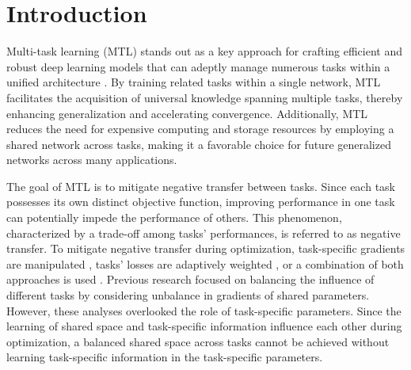 \section{Introduction}
Multi-task learning (MTL) stands out as a key approach for crafting efficient and robust deep learning models that can adeptly manage numerous tasks within a unified architecture \citep{caruana1997multitask}. By training related tasks within a single network, MTL facilitates the acquisition of universal knowledge spanning multiple tasks, thereby enhancing generalization and accelerating convergence. Additionally, MTL reduces the need for expensive computing and storage resources by employing a shared network across tasks, making it a favorable choice for future generalized networks across many applications.

The goal of MTL is to mitigate negative transfer \citep{crawshaw2020multi} between tasks. Since each task possesses its own distinct objective function, improving performance in one task can potentially impede the performance of others. This phenomenon, characterized by a trade-off among tasks' performances, is referred to as negative transfer. To mitigate negative transfer during optimization, task-specific gradients are manipulated \citep{RN19, RN36, RN20, RN18, liu2021towards, navon2022multi, senushkin2023independent}, tasks' losses are adaptively weighted \citep{RN23, RN25, RN26, liu2024famo}, or a combination of both approaches is used \citep{liu2021towards}. Previous research focused on balancing the influence of different tasks by considering unbalance in gradients of shared parameters. However, these analyses overlooked the role of task-specific parameters. Since the learning of shared space and task-specific information influence each other during optimization, a balanced shared space across tasks cannot be achieved without learning task-specific information in the task-specific parameters.

